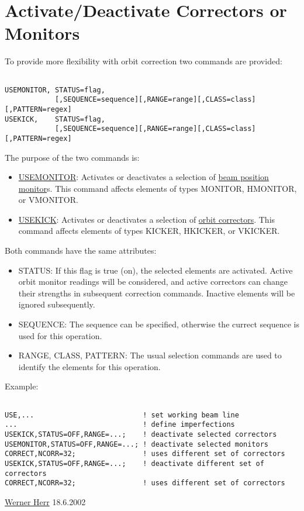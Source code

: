 





\section{Activate/Deactivate Correctors or Monitors}  To provide more flexibility with orbit correction two commands are provided: 
\begin{verbatim}

USEMONITOR, STATUS=flag,
            [,SEQUENCE=sequence][,RANGE=range][,CLASS=class][,PATTERN=regex]
USEKICK,    STATUS=flag,
            [,SEQUENCE=sequence][,RANGE=range][,CLASS=class][,PATTERN=regex]
\end{verbatim} The purpose of the two commands is: 
\begin{itemize}
	\item \href{monitor}{USEMONITOR}: Activates or deactivates a selection of \href{../Introduction/monitors.html}{beam position monitor}s. This command affects elements of types MONITOR, HMONITOR, or VMONITOR. 
	\item \href{kick}{USEKICK}: Activates or deactivates a selection of \href{../Introduction/kickers.html}{orbit correctors}. This command affects elements of types KICKER, HKICKER, or VKICKER. 
\end{itemize} Both commands have the same attributes: 
\begin{itemize}
	\item STATUS: If this flag is true (on), the selected elements are activated. Active orbit monitor readings will be considered, and active correctors can change their strengths in subsequent correction commands. Inactive elements will be ignored subsequently. 
	\item SEQUENCE: The sequence can be specified, otherwise the currect sequence is used for this operation. 
	\item RANGE, CLASS, PATTERN: The usual selection commands are used to identify the elements    for this operation. 
\end{itemize} Example:                                                                  
\begin{verbatim}

USE,...                          ! set working beam line 
...                              ! define imperfections 
USEKICK,STATUS=OFF,RANGE=...;    ! deactivate selected correctors 
USEMONITOR,STATUS=OFF,RANGE=...; ! deactivate selected monitors   
CORRECT,NCORR=32;                ! uses different set of correctors
USEKICK,STATUS=OFF,RANGE=...;    ! deactivate different set of correctors 
CORRECT,NCORR=32;                ! uses different set of correctors
\end{verbatim}\href{http://consult.cern.ch/xwho/people/1808}{Werner Herr} 18.6.2002 

